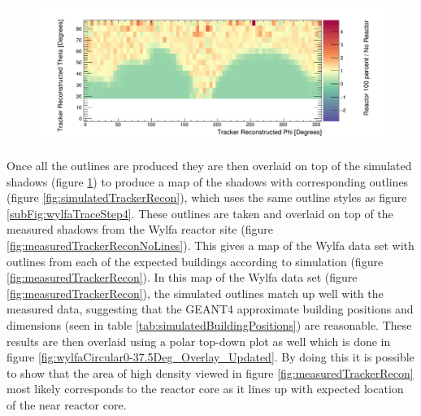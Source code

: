 \begin{figure}[!h]
 \centering
 \includegraphics[width=\linewidth]{Chapter5/Figs/wylfaRasterNew/simulatedTrackerReconNoLines.png}
 \label{fig:simulatedTrackerReconNoLines}
\end{figure}

Once all the outlines are produced they are then overlaid on top of the simulated shadows (figure \ref{fig:simulatedTrackerReconNoLines}) to produce a map of the shadows with corresponding outlines (figure \ref{fig:simulatedTrackerRecon}), which uses the same outline styles as figure \ref{subFig:wylfaTraceStep4}. These outlines are taken and overlaid on top of the measured shadows from the Wylfa reactor site (figure \ref{fig:measuredTrackerReconNoLines}). This gives a map of the Wylfa data set with outlines from each of the expected buildings according to simulation (figure \ref{fig:measuredTrackerRecon}). In this map of the Wylfa data set (figure \ref{fig:measuredTrackerRecon}), the simulated outlines match up well with the measured data, suggesting that the GEANT4 approximate building positions and dimensions (seen in table \ref{tab:simulatedBuildingPositions}) are reasonable. These results are then overlaid using a polar top-down plot as well which is done in figure \ref{fig:wylfaCircular0-37.5Deg_Overlay_Updated}. By doing this it is possible to show that the area of high density viewed in figure \ref{fig:measuredTrackerRecon} most likely corresponds to the reactor core as it lines up with expected location of the near reactor core. 


